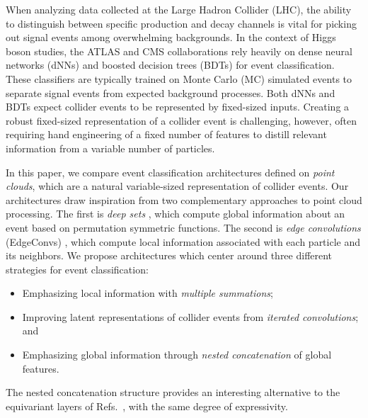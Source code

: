 \documentclass[aps,prd,twocolumn,superscriptaddress,floatfix,longbibliography,preprintnumbers,nofootinbib]{revtex4-1} %
\DeclareRobustCommand{\Sec}[1]{Sec.~\ref{sec:#1}}
\DeclareRobustCommand{\RRefs}[1]{Refs.~\cite{#1}}
\newcounter{para}
\begin{document}
When analyzing data collected at the Large Hadron Collider (LHC), the ability to distinguish between specific production and decay channels is vital for picking out signal events among overwhelming backgrounds.
%
In the context of Higgs boson studies, the ATLAS and CMS collaborations rely heavily on dense neural networks (dNNs) \cite{CMS:2019lcn, CMS:2018hnq} and boosted decision trees (BDTs) \cite{ATLAS:2022yrq,ATLAS:2020evk,ATLAS:2018ynr,ATLAS:2017cen,ATLAS:2018kot,ATLAS:2017fak,ATLAS:2020fcp,ATLAS:2014vuz} for event classification.
%
These classifiers are typically trained on Monte Carlo (MC) simulated events to separate signal events from expected background processes.
%
Both dNNs and BDTs expect collider events to be represented by fixed-sized inputs.
%
Creating a robust fixed-sized representation of a collider event is challenging, however, often requiring hand engineering of a fixed number of features to distill relevant information from a variable number of particles.

\begin{figure*}
 \centering
 \def\svgwidth{\textwidth}
 
 \caption{
 Summary of the point cloud architectures studied in this paper, where the numbers refer to equations in the text.
 We also highlight limits where one architecture reduces to another.
 The Particlewise, Pairwise, and Tripletwise architectures are described in \Sec{local}.
 The Nonlinear Pairwise and Iterated Nonlinear Pairwise architectures are described in \Sec{iterated}.
The Nested Concatenation and Nested Concatenation w/ Memory architectures are described in \Sec{global} 
 }
 \label{fig:archs}
\end{figure*}

In this paper, we compare event classification architectures defined on \emph{point clouds}, which are a natural variable-sized representation of collider events.
%
Our architectures draw inspiration from two complementary approaches to point cloud processing.
%
The first is \emph{deep sets} \cite{Zaheer2017,Komiske:2018cqr}, which compute global information about an event based on permutation symmetric functions.
%
The second is \emph{edge convolutions} (EdgeConvs) \cite{Wang:2018nkf,Qu:2019gqs}, which compute local information associated with each particle and its neighbors.
%
We propose architectures which center around three different strategies for event classification:
%
\begin{itemize}
\item Emphasizing local information with \textit{multiple summations};
\item Improving latent representations of collider events from \textit{iterated convolutions}; and
\item Emphasizing global information through \textit{nested concatenation} of global features.
\end{itemize}
%
The nested concatenation structure provides an interesting alternative to the equivariant layers of \RRefs{Zaheer2017,Dolan:2020qkr}, with the same degree of expressivity.
\end{document}
